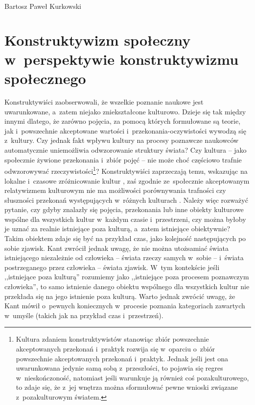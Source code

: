 \begin{artplenv}{Bartosz Paweł Kurkowski}
\section{Konstruktywizm społeczny w~perspektywie konstruktywizmu społecznego}

Konstruktywiści zaobserwowali, że wszelkie poznanie naukowe jest uwarunkowane, a~zatem niejako zniekształcone
kulturowo. Dzieje się tak między innymi dlatego, że zarówno pojęcia, za pomocą których formułowane są teorie,
jak i~powszechnie akceptowane wartości i~przekonania-oczywistości wywodzą się z~kultury. Czy jednak fakt wpływu kultury na
procesy poznawcze naukowców automatycznie uniemożliwia odwzorowanie struktury świata? Czy kultura -- jako społecznie
żywione przekonania i~zbiór pojęć -- nie może choć częściowo trafnie odwzorowywać rzeczywistości\footnote{Kultura
zdaniem konstruktywistów stanowiąc zbiór powszechnie akceptowanych przekonań i~praktyk rozwija się w~oparciu o~zbiór
powszechnie akceptowanych przekonań i~praktyk. Jednak jeśli jest ona uwarunkowana jedynie samą sobą z~przeszłości, to
pojawia się regres w~nieskończoność, natomiast jeśli warunkuje ją również coś pozakulturowego, to zdaje się, że z~jej
wnętrza można sformułować pewne wnioski związane z~pozakulturowym światem.}? Konstruktywiści zaprzeczają temu,
wskazując na lokalne i~czasowe zróżnicowanie kultur
\parencite[s.~33]{zboron_teorie_2009},
zaś zgodnie
ze~społecznie akceptowanym relatywizmem kulturowym nie ma możliwości porównywania trafności czy słuszności przekonań
występujących w~różnych kulturach
\parencite[s.~76]{przymenski_socjologia:_2008}.
Należy więc rozważyć pytanie, czy
gdyby znalazły się pojęcia, przekonania lub inne obiekty kulturowe wspólne dla wszystkich kultur w~każdym
czasie i~przestrzeni, czy można byłoby je uznać za realnie istniejące poza kulturą, a~zatem istniejące obiektywnie? Takim
obiektem zdaje się być na przykład czas, jako kolejność następujących po sobie zjawisk. Kant zwrócił jednak uwagę, że
nie można utożsamiać świata istniejącego niezależnie od człowieka -- świata rzeczy samych w~sobie -- i~świata
postrzeganego przez człowieka -- świata zjawisk. W~tym kontekście jeśli ,,istniejące poza kulturą'' rozumiemy jako
,,istniejące poza procesem poznawczym człowieka'', to samo istnienie danego obiektu wspólnego dla wszystkich kultur nie
przekłada się na jego istnienie poza kulturą. Warto jednak zwrócić uwagę, że Kant mówił o~pewnych
koniecznych w~procesie poznania kategoriach zawartych w~umyśle (takich jak na przykład czas i~przestrzeń).

\end{artplenv}
